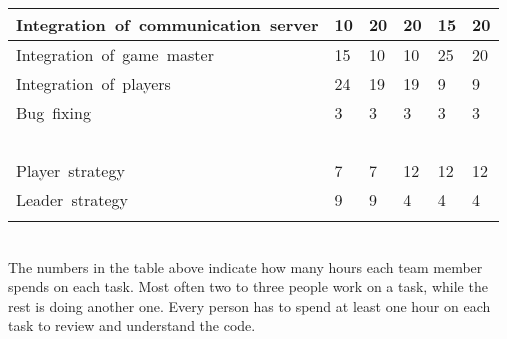 \documentclass[11pt,a4paper]{article}
\begin{document}
\begin{tabular}{ | p{4cm} | p{2cm} | p{2cm} | p{2cm} | p{2cm} | p{2cm} | }
	Integration\ of\ communication\ server & 10 & 20 & 20 & 15 & 20   \\ \hline
	Integration\ of\ game\ master & 15 & 10 & 10 & 25 & 20    \\ \hline
	Integration\ of\ players & 24 & 19 & 19 & 9 & 9    \\ \hline
	Bug\ fixing & 3 & 3 & 3 & 3 & 3   \\ \hline
	\  & \  & \  & \  & \  &   \\ \hline
	Player\ strategy & 7 & 7 & 12 & 12 & 12   \\ \hline
	Leader\ strategy & 9 & 9 & 4 & 4 & 4 \\ \hline
	 &  &  &  &  &  \\ \hline
\end{tabular} \\

The numbers in the table above indicate how many hours each team member spends on each task. Most often two to three people work on a task, while the rest is doing another one. Every person has to spend at least one hour on each task to review and understand the code.
\end{document}
